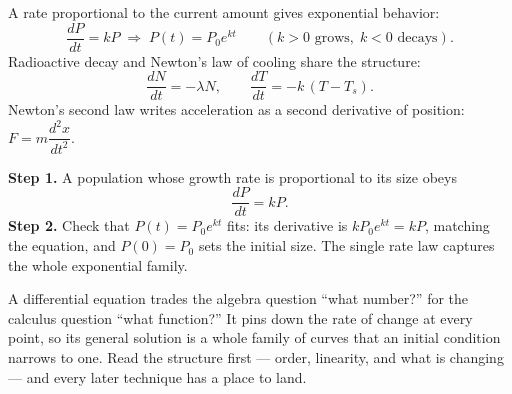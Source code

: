 \documentclass[11pt]{article}
\begin{document}
\begin{formulabox}
A rate proportional to the current amount gives exponential behavior:
\[
    \frac{dP}{dt} = kP \;\Longrightarrow\; P(t) = P_{0}e^{kt}
    \qquad (k>0 \text{ grows},\; k<0 \text{ decays}).
\]
Radioactive decay and Newton's law of cooling share the structure:
\[
    \frac{dN}{dt} = -\lambda N,
    \qquad
    \frac{dT}{dt} = -k\,(T - T_{s}).
\]
Newton's second law writes acceleration as a second derivative of position:
$F = m\dfrac{d^{2}x}{dt^{2}}$.
\end{formulabox}

\begin{examplebox}
\textbf{Step 1.} A population whose growth rate is proportional to its size
obeys
\[ \frac{dP}{dt} = kP. \]
\textbf{Step 2.} Check that $P(t) = P_{0}e^{kt}$ fits: its derivative is
$kP_{0}e^{kt} = kP$, matching the equation, and $P(0) = P_{0}$ sets the initial
size. The single rate law captures the whole exponential family.
\end{examplebox}

\vspace{0.8em}
\begin{conceptbox}
A differential equation trades the algebra question ``what number?'' for the
calculus question ``what \textcolor{accentorange}{function}?'' It pins down the
\textcolor{accentorange}{rate of change} at every point, so its general solution
is a \textcolor{accentorange}{whole family of curves} that an
\textcolor{accentorange}{initial condition} narrows to one. Read the structure
first --- order, linearity, and what is changing --- and every later technique
has a place to land.
\end{conceptbox}
\end{document}
